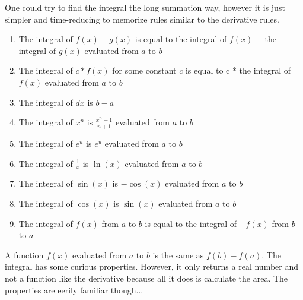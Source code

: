 \documentclass[../revisedmain.tex]{subfiles}
\begin{document}
One could try to find the integral the long summation way, however it is just simpler and time-reducing to memorize rules similar to the derivative rules.
\begin{enumerate}
	\item The integral of $f(x)+g(x)$ is equal to the integral of $f(x)$ + the integral of $g(x)$ evaluated from $a$ to $b$
	\item The integral of $c*f(x)$ for some constant $c$ is equal to c * the integral of $f(x)$ evaluated from $a$ to $b$
	\item The integral of $dx$ is $b-a$
	\item The integral of $x^n$ is $\displaystyle\frac{x^n+1}{n+1}$ evaluated from $a$ to $b$
	\item The integral of $e^u$ is $e^u$ evaluated from $a$ to $b$
	\item The integral of $\displaystyle\frac{1}{x}$ is $\ln(x)$ evaluated from $a$ to $b$
	\item The integral of $\sin(x)$ is $-\cos(x)$ evaluated from $a$ to $b$
	\item The integral of $\cos(x)$ is $\sin(x)$ evaluated from $a$ to $b$
	\item The integral of $f(x)$ from $a$ to $b$ is equal to the integral of $-f(x)$ from $b$ to $a$
\end{enumerate}
A function $f(x)$ evaluated from $a$ to $b$ is the same as $f(b)-f(a)$. The integral has some curious properties. However, it only returns a real number and not a function like the derivative because all it does is calculate the area.	The properties are eerily familiar though...
\end{document}
